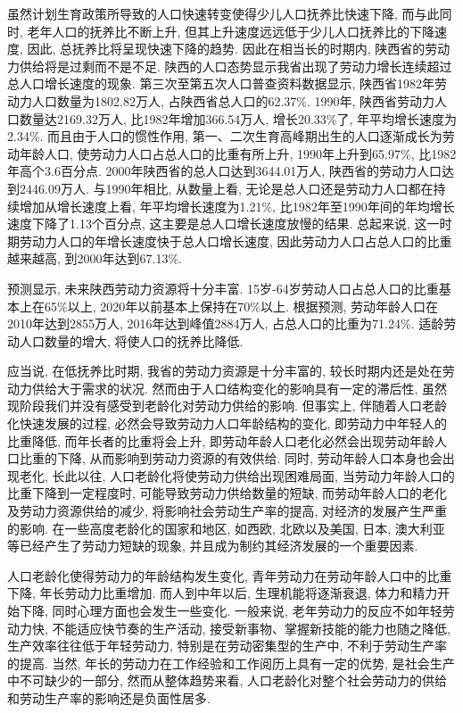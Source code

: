\documentclass[a4paper, 12pt, UTF8]{article}
\begin{document}
虽然计划生育政策所导致的人口快速转变使得少儿人口抚养比快速下降, 而与此同时, 老年人口的抚养比不断上升, 但其上升速度远远低于少儿人口抚养比的下降速度, 因此, 总抚养比将呈现快速下降的趋势. 因此在相当长的时期内, 陕西省的劳动力供给将是过剩而不是不足. 陕西的人口态势显示我省出现了劳动力增长连续超过总人口增长速度的现象. 第三次至第五次人口普查资料数据显示, 陕西省1982年劳动力人口数量为1802.82万人, 占陕西省总人口的62.37\%. 1990年, 陕西省劳动力人口数量达2169.32万人, 比1982年增加366.54万人, 增长20.33\%了, 年平均增长速度为2.34\%. 而且由于人口的惯性作用, 第一、二次生育高峰期出生的人口逐渐成长为劳动年龄人口, 使劳动力人口占总人口的比重有所上升, 1990年上升到65.97\%, 比1982年高个3.6百分点. 2000年陕西省的总人口达到3644.01万人, 陕西省的劳动力人口达到2446.09万人. 与1990年相比, 从数量上看, 无论是总人口还是劳动力人口都在持续增加从增长速度上看, 年平均增长速度为1.21\%, 比1982年至1990年间的年均增长速度下降了1.13个百分点, 这主要是总人口增长速度放慢的结果. 总起来说, 这一时期劳动力人口的年增长速度快于总人口增长速度, 因此劳动力人口占总人口的比重越来越高, 到2000年达到67.13\%.

预测显示, 未来陕西劳动力资源将十分丰富. 15岁-64岁劳动人口占总人口的比重基本上在65\%以上, 2020年以前基本上保持在70\%以上. 根据预测, 劳动年龄人口在2010年达到2855万人, 2016年达到峰值2884万人, 占总人口的比重为71.24\%. 适龄劳动人口数量的增大, 将使人口的抚养比降低. 

应当说, 在低抚养比时期, 我省的劳动力资源是十分丰富的, 较长时期内还是处在劳动力供给大于需求的状况. 然而由于人口结构变化的影响具有一定的滞后性, 虽然现阶段我们并没有感受到老龄化对劳动力供给的影响. 但事实上, 伴随着人口老龄化快速发展的过程, 必然会导致劳动力人口年龄结构的变化, 即劳动力中年轻人的比重降低, 而年长者的比重将会上升, 即劳动年龄人口老化必然会出现劳动年龄人口比重的下降, 从而影响到劳动力资源的有效供给. 同时, 劳动年龄人口本身也会出现老化, 长此以往, 人口老龄化将使劳动力供给出现困难局面, 当劳动力年龄人口的比重下降到一定程度时, 可能导致劳动力供给数量的短缺, 而劳动年龄人口的老化及劳动力资源供给的减少, 将影响社会劳动生产率的提高, 对经济的发展产生严重的影响. 在一些高度老龄化的国家和地区, 如西欧, 北欧以及美国, 日本, 澳大利亚等已经产生了劳动力短缺的现象, 并且成为制约其经济发展的一个重要因素. 

人口老龄化使得劳动力的年龄结构发生变化, 青年劳动力在劳动年龄人口中的比重下降, 年长劳动力比重增加. 而人到中年以后, 生理机能将逐渐衰退, 体力和精力开始下降, 同时心理方面也会发生一些变化. 一般来说, 老年劳动力的反应不如年轻劳动力快, 不能适应快节奏的生产活动, 接受新事物、掌握新技能的能力也随之降低, 生产效率往往低于年轻劳动力, 特别是在劳动密集型的生产中, 不利于劳动生产率的提高. 当然, 年长的劳动力在工作经验和工作阅历上具有一定的优势, 是社会生产中不可缺少的一部分, 然而从整体趋势来看, 人口老龄化对整个社会劳动力的供给和劳动生产率的影响还是负面性居多.
\end{document}
